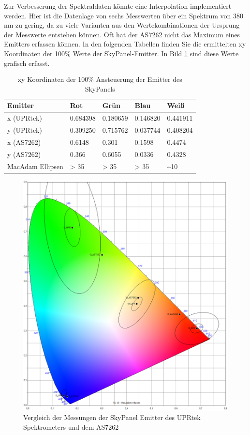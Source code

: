 \documentclass[11pt]{scrartcl}
\begin{document}
\noindent
Zur Verbesserung der Spektraldaten könnte eine Interpolation implementiert werden. Hier ist die Datenlage von sechs Messwerten
über ein Spektrum von 380 nm zu gering, da zu viele Varianten aus den Wertekombinationen der Ursprung der Messwerte entstehen
können. Oft hat der AS7262 nicht das Maximum eines Emitters erfassen können. In den folgenden Tabellen finden Sie die
ermittelten xy Koordinaten der 100\% Werte der SkyPanel-Emitter. In Bild \ref{compareUPRtekAS7262} sind diese Werte grafisch
erfasst.
\begin{table}[H]
    \begin{tabularx}{\textwidth}{|l|X|X|X|X|}
        \hline Emitter   & Rot      & Grün     & Blau     & Weiß\\\hline
        x (UPRtek)       & 0.684398 & 0.180659 & 0.146820 & 0.441911\\\hline
        y (UPRtek)       & 0.309250 & 0.715762 & 0.037744 & 0.408204\\\hline
        x (AS7262)       & 0.6148   & 0.301    & 0.1598   & 0.4474\\\hline
        y (AS7262)       & 0.366    & 0.6055   & 0.0336   & 0.4328\\\hline
        MacAdam Ellipsen & > 35     & > 35     & > 35     & \textasciitilde 10\\\hline
    \end{tabularx}
    \caption{xy Koordinaten der 100\% Ansteuerung der Emitter des SkyPanels}
\end{table}
\begin{figure}[H]
    \begin{center}
        \includegraphics[width=.93\textwidth]{images/macAdam/comparison_upr_as7262.png}
    \end{center}
    \caption{Vergleich der Messungen der SkyPanel Emitter des UPRtek Spektrometers und dem AS7262} \label{compareUPRtekAS7262}
\end{figure}
\end{document}
